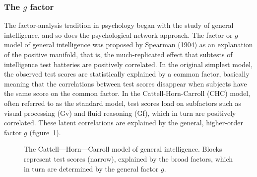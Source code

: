 \documentclass[
  a4paper,
  DIV=11,
  numbers=noendperiod,
  oneside]{scrreprt}
\begin{document}
\subsubsection{\texorpdfstring{The \(g\)
factor}{The g factor}}\label{sec-The-g-factor}

The factor-analysis tradition in psychology began with the study of
general intelligence, and so does the psychological network approach.
The factor or \(g\) model of general intelligence was proposed by
Spearman (1904) as an explanation of the positive manifold, that is, the
much-replicated effect that subtests of intelligence test batteries are
positively correlated. In the original simplest model, the observed test
scores are statistically explained by a common factor, basically meaning
that the correlations between test scores disappear when subjects have
the same score on the common factor. In the Cattell-Horn-Carroll (CHC)
model, often referred to as the standard model, test scores load on
subfactors such as visual processing (Gv) and fluid reasoning (Gf),
which in turn are positively correlated. These latent correlations are
explained by the general, higher-order factor \(g\)
(figure~\ref{fig-ch6-img4-old-73}).

\begin{figure}


\caption{\label{fig-ch6-img4-old-73}The Cattell---Horn---Carroll model
of general intelligence. Blocks represent test scores (narrow),
explained by the broad factors, which in turn are determined by the
general factor \(g\).}

\end{figure}%
\end{document}
